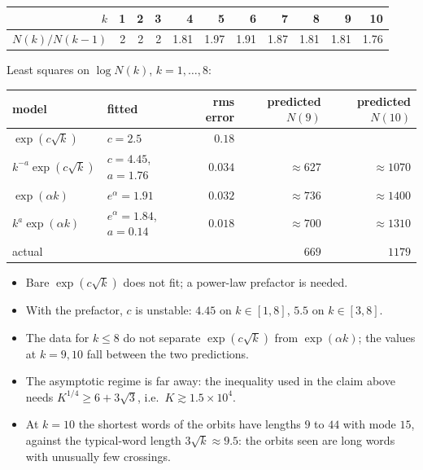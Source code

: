 \documentclass[10pt]{article}
\begin{document}
\begin{table}[H]
	\centering
	\begin{tabular}{r|rrrrrrrrrr}
		\toprule
		$k$ & 1 & 2 & 3 & 4 & 5 & 6 & 7 & 8 & 9 & 10 \\
		\midrule
		$N(k)/N(k-1)$ & 2 & 2 & 2 & 1.81 & 1.97 & 1.91 & 1.87 & 1.81 & 1.81 & 1.76 \\
		\bottomrule
	\end{tabular}
\end{table}

Least squares on $\log N(k)$, $k = 1,\ldots,8$:

\begin{table}[H]
	\centering
	\begin{tabular}{l|l|r|rr}
		\toprule
		model & fitted & rms error & predicted $N(9)$ & predicted $N(10)$ \\
		\midrule
		$\exp(c\sqrt{k})$ & $c = 2.5$ & $0.18$ & & \\
		$k^{-a}\exp(c\sqrt{k})$ & $c = 4.45$, $a = 1.76$ & $0.034$ & $\approx 627$ & $\approx 1070$ \\
		$\exp(\alpha k)$ & $e^{\alpha} = 1.91$ & $0.032$ & $\approx 736$ & $\approx 1400$ \\
		$k^{a}\exp(\alpha k)$ & $e^{\alpha} = 1.84$, $a = 0.14$ & $0.018$ & $\approx 700$ & $\approx 1310$ \\
		\midrule
		actual & & & $669$ & $1179$ \\
		\bottomrule
	\end{tabular}
\end{table}

\begin{rmk}
	\begin{itemize}
		\item Bare $\exp(c\sqrt{k})$ does not fit; a power-law prefactor is needed.
		\item With the prefactor, $c$ is unstable: $4.45$ on $k \in [1,8]$, $5.5$ on $k \in [3,8]$.
		\item The data for $k \leq 8$ do not separate $\exp(c\sqrt{k})$ from $\exp(\alpha k)$; the values at $k = 9, 10$ fall between the two predictions.
		\item The asymptotic regime is far away: the inequality used in the claim above needs $K^{1/4} \geq 6 + 3\sqrt{3}$, i.e.\ $K \gtrsim 1.5 \times 10^4$.
		\item At $k = 10$ the shortest words of the orbits have lengths $9$ to $44$ with mode $15$, against the typical-word length $3\sqrt{k} \approx 9.5$: the orbits seen are long words with unusually few crossings.
	\end{itemize}
\end{rmk}
\end{document}
